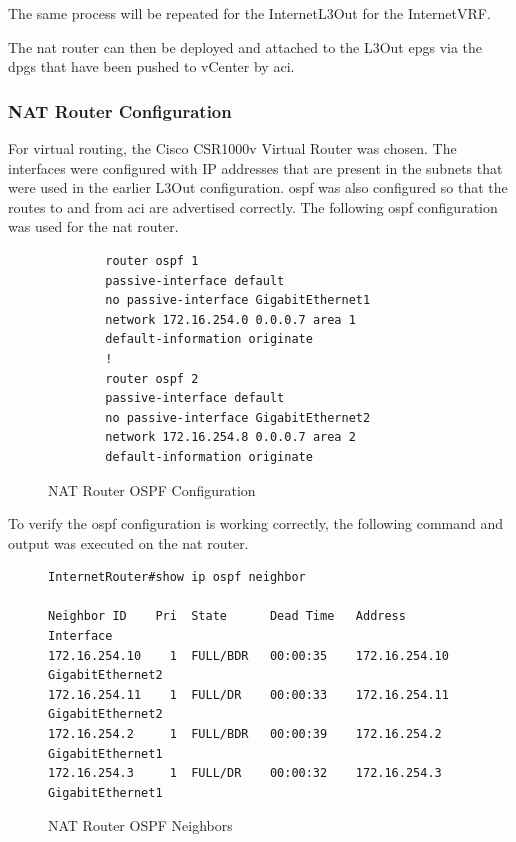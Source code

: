 The same process will be repeated for the InternetL3Out for the InternetVRF.

The \gls{nat} router can then be deployed and attached to the L3Out \gls{epg}s via the \gls{dpg}s that have been pushed to vCenter by \gls{aci}.

\subsubsection{NAT Router Configuration}

For virtual routing, the Cisco CSR1000v Virtual Router was chosen. The interfaces were configured with IP addresses that are present in the subnets that were used in the earlier L3Out configuration. \gls{ospf} was also configured so that the routes to and from \gls{aci} are advertised correctly. The following \gls{ospf} configuration was used for the \gls{nat} router.

\begin{figure}[H]
    \begin{verbatim}
        router ospf 1
        passive-interface default
        no passive-interface GigabitEthernet1
        network 172.16.254.0 0.0.0.7 area 1
        default-information originate
        !
        router ospf 2
        passive-interface default
        no passive-interface GigabitEthernet2
        network 172.16.254.8 0.0.0.7 area 2
        default-information originate
    \end{verbatim}
    \caption{NAT Router OSPF Configuration}
    \label{fig:nat-ospf}
\end{figure}

To verify the \gls{ospf} configuration is working correctly, the following command and output was executed on the \gls{nat} router.

\begin{figure}[H]
    \centering
    \begin{small}
        \begin{verbatim}
InternetRouter#show ip ospf neighbor

Neighbor ID    Pri  State      Dead Time   Address         Interface
172.16.254.10    1  FULL/BDR   00:00:35    172.16.254.10   GigabitEthernet2
172.16.254.11    1  FULL/DR    00:00:33    172.16.254.11   GigabitEthernet2
172.16.254.2     1  FULL/BDR   00:00:39    172.16.254.2    GigabitEthernet1
172.16.254.3     1  FULL/DR    00:00:32    172.16.254.3    GigabitEthernet1

    \end{verbatim}
    \end{small}
    \caption{NAT Router OSPF Neighbors}
    \label{fig:nat-ospf-db}
\end{figure}

